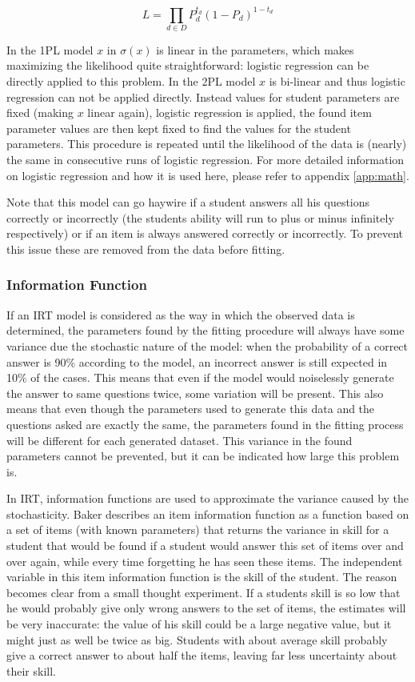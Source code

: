 \documentclass{scrartcl}
\begin{document}
\begin{equation}
\label{eq:likely}
L=\prod_{d \in D} P_{d}^{t_d}  (1- P_{d})^{1-t_d}
\end{equation}

In the 1PL model $x$ in $\sigma(x)$ is linear in the parameters, which makes maximizing the likelihood quite straightforward: logistic regression can be directly applied to this problem. In the 2PL model $x$ is bi-linear and thus logistic regression can not be applied directly. Instead values for student parameters are fixed (making $x$ linear again), logistic regression is applied, the found item parameter values are then kept fixed to find the values for the student parameters. This procedure is repeated until the likelihood of the data is (nearly) the same in consecutive runs of logistic regression. For more detailed information on logistic regression and how it is used here, please refer to appendix \ref{app:math}.

Note that this model can go haywire if a student answers all his questions correctly or incorrectly (the students ability will run to plus or minus infinitely respectively) or if an item is always answered correctly  or incorrectly. To prevent this issue these are removed from the data before fitting.

\subsubsection{Information Function}
\label{sec:inherent}
If an IRT model is considered as the way in which the observed data is determined, the parameters found by the fitting procedure will always have some variance due the stochastic nature of the model: when the probability of a correct answer is 90\% according to the model, an incorrect answer is still expected in 10\% of the cases. This means that even if the model would noiselessly generate the answer to same questions twice, some variation will be present. This also means that even though the parameters used to generate this data and the questions asked are exactly the same, the parameters found in the fitting process will be different for each generated dataset. This variance in the found parameters cannot be prevented, but it can be indicated how large this problem is.  

In IRT, information functions are used to approximate the variance caused by the stochasticity. Baker \cite{basicbaker} describes an item information function as a function based on a set of items (with known parameters) that returns the variance in skill for a student that would be found if a student would answer this set of items over and over again, while every time forgetting he has seen these items. The independent variable in this item information function is the skill of the student. The reason becomes clear from a small thought experiment. If a students skill is so low that he would probably give only wrong answers to the set of items, the estimates will be very inaccurate: the value of his skill could be a large negative value, but it might just as well be twice as big. Students with about average skill probably give a correct answer to about half the items, leaving far less uncertainty about their skill.
\end{document}
